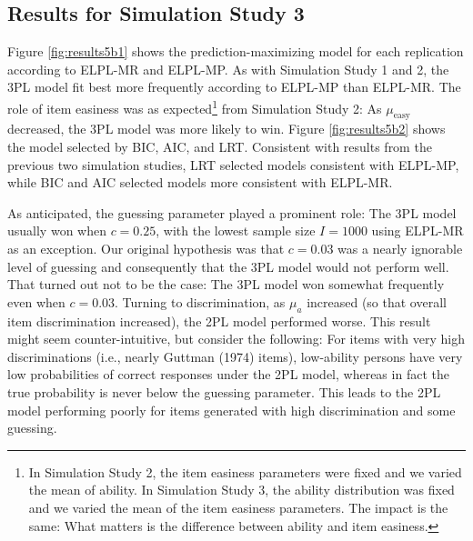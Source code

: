 \documentclass[
  english,
  man,floatsintext]{apa7}
\begin{document}
\hypertarget{results-for-simulation-study-3}{%
\subsection{Results for Simulation Study 3}\label{results-for-simulation-study-3}}

Figure \ref{fig:results5b1} shows the prediction-maximizing model for each replication according to ELPL-MR and ELPL-MP. As with Simulation Study 1 and 2, the 3PL model fit best more frequently according to ELPL-MP than ELPL-MR. The role of item easiness was as expected\footnote{In Simulation Study 2, the item easiness parameters were fixed and we varied the mean of ability. In Simulation Study 3, the ability distribution was fixed and we varied the mean of the item easiness parameters. The impact is the same: What matters is the difference between ability and item easiness.} from Simulation Study 2: As \(\mu_{\text{easy}}\) decreased, the 3PL model was more likely to win. Figure \ref{fig:results5b2} shows the model selected by BIC, AIC, and LRT. Consistent with results from the previous two simulation studies, LRT selected models consistent with ELPL-MP, while BIC and AIC selected models more consistent with ELPL-MR.

As anticipated, the guessing parameter played a prominent role: The 3PL model usually won when \(c = 0.25\), with the lowest sample size \(I = 1000\) using ELPL-MR as an exception. Our original hypothesis was that \(c = 0.03\) was a nearly ignorable level of guessing and consequently that the 3PL model would not perform well. That turned out not to be the case: The 3PL model won somewhat frequently even when \(c = 0.03\). Turning to discrimination, as \(\mu_{a}\) increased (so that overall item discrimination increased), the 2PL model performed worse. This result might seem counter-intuitive, but consider the following: For items with very high discriminations (i.e., nearly Guttman (1974) items), low-ability persons have very low probabilities of correct responses under the 2PL model, whereas in fact the true probability is never below the guessing parameter. This leads to the 2PL model performing poorly for items generated with high discrimination and some guessing.
\end{document}
